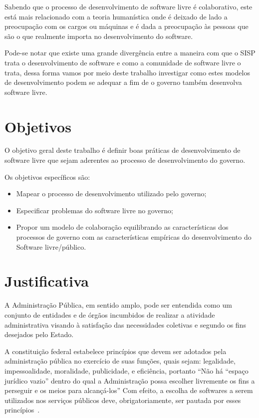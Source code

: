 Sabendo que o processo de desenvolvimento de software livre é colaborativo, este 
está mais relacionado com a teoria humanística onde é deixado de lado a preocupação
com os cargos ou máquinas e é dada a preocupação às pessoas que são o que realmente
importa no desenvolvimento do software.

Pode-se notar que existe uma grande divergência entre a maneira com que o SISP trata
o desenvolvimento de software e como a comunidade de software livre o trata, dessa forma vamos
por meio deste trabalho investigar como estes modelos de desenvolvimento podem 
se adequar a fim de o governo também desenvolva software livre.

\section{Objetivos}

O objetivo geral deste trabalho é definir boas práticas de desenvolvimento de 
software livre que sejam aderentes ao processo de desenvolvimento do governo.

Os objetivos específicos são:

\begin{itemize}
\item Mapear o processo de desenvolvimento utilizado pelo governo;
\item Especificar problemas do software livre no governo;
\item Propor um modelo de colaboração equilibrando as características 
dos processos de governo com as características empíricas do desenvolvimento 
do Software livre/público.
\end{itemize}

\section{Justificativa}

A Administração Pública, em sentido amplo, pode ser entendida como um conjunto 
de entidades e de órgãos incumbidos de realizar a atividade administrativa visando 
à satisfação das necessidades coletivas e segundo os fins desejados pelo Estado.
\cite{coutinho2012uso}

A constituição federal estabelece princípios que devem ser adotados pela administração pública
no exercício de suas funções, quais sejam: legalidade, impessoalidade, moralidade, publicidade, e
eficiência, portanto “Não há “espaço jurídico vazio” dentro do qual a Administração possa escolher
livremente os fins a perseguir e os meios para alcançá-los” 
%
Com efeito, a escolha de softwares a serem utilizados nos serviços públicos deve, obrigatoriamente,
ser pautada por esses princípios~\cite{coutinho2012uso}.

